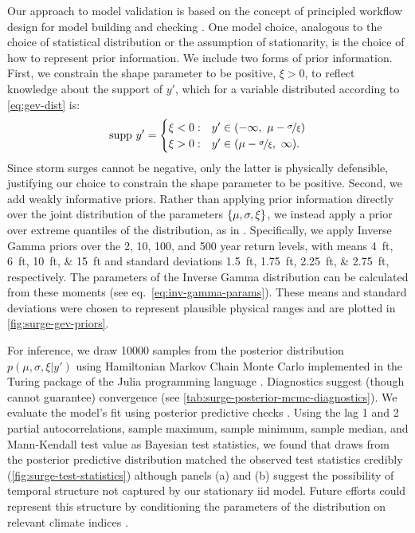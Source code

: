 \documentclass[11pt]{article}
\begin{document}
Our approach to model validation is based on the concept of principled workflow design for model building and checking \citep[see][for details]{gelman_workflow:2020}.
One model choice, analogous to the choice of statistical distribution or the assumption of stationarity, is the choice of how to represent prior information.
We include two forms of prior information.
First, we constrain the shape parameter to be positive, $\xi > 0$, to reflect knowledge about the support of $y'$, which for a variable distributed according to \cref{eq:gev-dist} is:
\begin{equation*}
    \mathrm{supp}~ y' =
    \begin{cases}
        \xi < 0: & y' \in \qty(-\infty,~ \mu - \nicefrac{\sigma}{\xi}) \\
        \xi > 0: & y' \in \qty(\mu-\nicefrac{\sigma}{\xi},~ \infty).
    \end{cases}
\end{equation*}
Since storm surges cannot be negative, only the latter is physically defensible, justifying our choice to constrain the shape parameter to be positive.
Second, we add weakly informative priors.
Rather than applying prior information directly over the joint distribution of the parameters $\qty{\mu,\sigma,\xi}$, we instead apply a prior over extreme quantiles of the distribution, as in \citet{coles_evd:1996}.
Specifically, we apply Inverse Gamma priors over the 2, 10, 100, and 500 year return levels, with means \SIlist{4;6;10;15}{ft} and standard deviations \SIlist{1.5;1.75;2.25;2.75}{ft}, respectively.
The parameters of the Inverse Gamma distribution can be calculated from these moments (see eq.~\ref{eq:inv-gamma-params}).
These means and standard deviations were chosen to represent plausible physical ranges and are plotted in \cref{fig:surge-gev-priors}.

For inference, we draw \num{10000} samples from the posterior distribution $p(\mu,\sigma,\xi | y')$ using Hamiltonian Markov Chain Monte Carlo \citep{Betancourt:2017vd,hoffman_nuts:2011} implemented in the Turing package of the Julia programming language \citep{perkel_julia:2019,ge_turing:2018,tarek_dynamicppl:2020,besancon_distributions.jl:2021,bezanson_julia:2012}.
Diagnostics suggest (though cannot guarantee) convergence (see \cref{tab:surge-posterior-mcmc-diagnostics}).
We evaluate the model's fit using posterior predictive checks \citep[see][section 2.4 and references therein]{gelman_workflow:2020}.
Using the lag 1 and 2 partial autocorrelations, sample maximum, sample minimum, sample median, and Mann-Kendall test value as Bayesian test statistics, we found that draws from the posterior predictive distribution matched the observed test statistics credibly (\cref{fig:surge-test-statistics}) although panels (a) and (b) suggest the possibility of temporal structure not captured by our stationary \gls{iid} model.
Future efforts could represent this structure by conditioning the parameters of the distribution on relevant climate indices \citep[as in][]{wong_structural:2020,Farnham:2016tw,farnham_jetstream:2017,ossandon_semibayesian:2021}.
\end{document}
